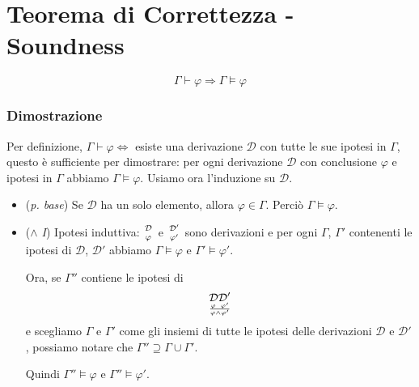 \documentclass[a4paper,12pt]{report}
\begin{document}
\newpage
\section{Teorema di Correttezza - Soundness}

\[ \Gamma \vdash \varphi \Rightarrow \Gamma \vDash \varphi \]
\subsubsection{Dimostrazione}
Per definizione, $\Gamma \vdash \varphi \iff$ esiste una derivazione $ \mathcal{D}$ con tutte le sue ipotesi in $\Gamma$, questo \`{e} sufficiente per dimostrare: per ogni derivazione $\mathcal{D}$ con conclusione $\varphi$ e ipotesi in $\Gamma$ abbiamo $\Gamma \vDash \varphi$. Usiamo ora l'induzione su $\mathcal{D}$.
\begin{itemize}
\item (\emph{p. base}) Se $\mathcal{D}$ ha un solo elemento, allora $\varphi \in \Gamma$.  Perci\`{o} $\Gamma \vDash \varphi$.
\item (\emph{$\wedge$ I}) Ipotesi induttiva: $\mathcal{D} \atop \varphi$ e $\mathcal{D}' \atop \varphi'$ sono derivazioni e per ogni $\Gamma$, $\Gamma'$ contenenti le ipotesi di $\mathcal{D}$, $\mathcal{D}'$ abbiamo $\Gamma \vDash \varphi$ e $\Gamma' \vDash \varphi'$.

Ora, se $\Gamma''$ contiene le ipotesi di
 \[ \mathcal{D} \mathcal{D}' \atop \frac{\varphi \thickspace\thickspace \varphi'}{\varphi \wedge \varphi'}\]
 e scegliamo $\Gamma$ e $\Gamma'$ come gli insiemi di tutte le ipotesi delle derivazioni $\mathcal{D}$ e $\mathcal{D}'$, possiamo 
notare che $\Gamma'' \supseteq \Gamma \cup \Gamma'$.

Quindi $\Gamma'' \vDash \varphi$ e $\Gamma'' \vDash \varphi'$. 
\end{itemize}
\end{document}
